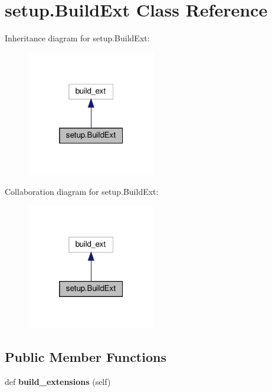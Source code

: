 \hypertarget{classsetup_1_1BuildExt}{}\section{setup.\+Build\+Ext Class Reference}
\label{classsetup_1_1BuildExt}


Inheritance diagram for setup.\+Build\+Ext\+:
\nopagebreak
\begin{figure}[H]
\begin{center}
\leavevmode
\includegraphics[width=160pt]{classsetup_1_1BuildExt__inherit__graph}
\end{center}
\end{figure}


Collaboration diagram for setup.\+Build\+Ext\+:
\nopagebreak
\begin{figure}[H]
\begin{center}
\leavevmode
\includegraphics[width=160pt]{classsetup_1_1BuildExt__coll__graph}
\end{center}
\end{figure}
\subsection*{Public Member Functions}
\begin{DoxyCompactItemize}
\item 
\mbox{\label{classsetup_1_1BuildExt_ae5dd612ab8d9a1acb6e965f899021be5}} 
def {\bfseries build\+\_\+extensions} (self)
\end{DoxyCompactItemize}
